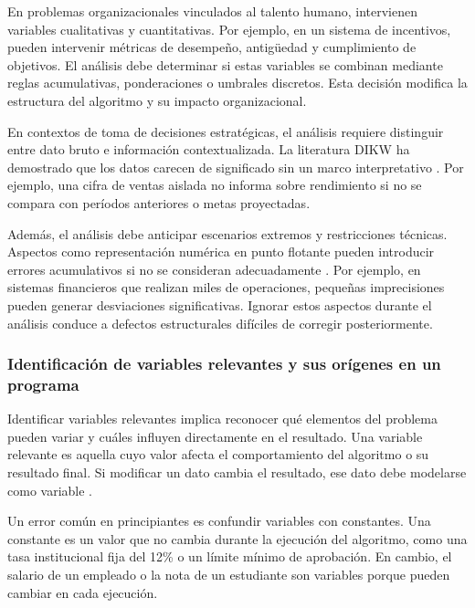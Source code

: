 \documentclass[12pt,twoside]{book}
\begin{document}
				En problemas organizacionales vinculados al talento humano, intervienen variables cualitativas y cuantitativas. Por ejemplo, en un sistema de incentivos, pueden intervenir métricas de desempeño, antigüedad y cumplimiento de objetivos. El análisis debe determinar si estas variables se combinan mediante reglas acumulativas, ponderaciones o umbrales discretos. Esta decisión modifica la estructura del algoritmo y su impacto organizacional.
				
				En contextos de toma de decisiones estratégicas, el análisis requiere distinguir entre dato bruto e información contextualizada. La literatura DIKW ha demostrado que los datos carecen de significado sin un marco interpretativo \cite{Baskarada2013Data,Fricke2019Knowledge}. Por ejemplo, una cifra de ventas aislada no informa sobre rendimiento si no se compara con períodos anteriores o metas proyectadas.
				
				Además, el análisis debe anticipar escenarios extremos y restricciones técnicas. Aspectos como representación numérica en punto flotante pueden introducir errores acumulativos si no se consideran adecuadamente \cite{Goldberg1991What,IEEE2019Standard754}. Por ejemplo, en sistemas financieros que realizan miles de operaciones, pequeñas imprecisiones pueden generar desviaciones significativas. Ignorar estos aspectos durante el análisis conduce a defectos estructurales difíciles de corregir posteriormente.
	
				\subsubsection{Identificación de variables relevantes y sus orígenes en un programa}
				\label{sssec:variables_origen}
					\noindent
					Identificar variables relevantes implica reconocer qué elementos del problema pueden variar y cuáles influyen directamente en el resultado. Una variable relevante es aquella cuyo valor afecta el comportamiento del algoritmo o su resultado final. Si modificar un dato cambia el resultado, ese dato debe modelarse como variable \cite{Hanly2015Problem,Farrell2018Programming}. 
					
					Un error común en principiantes es confundir variables con constantes. Una constante es un valor que no cambia durante la ejecución del algoritmo, como una tasa institucional fija del 12\% o un límite mínimo de aprobación. En cambio, el salario de un empleado o la nota de un estudiante son variables porque pueden cambiar en cada ejecución.
					
\end{document}
